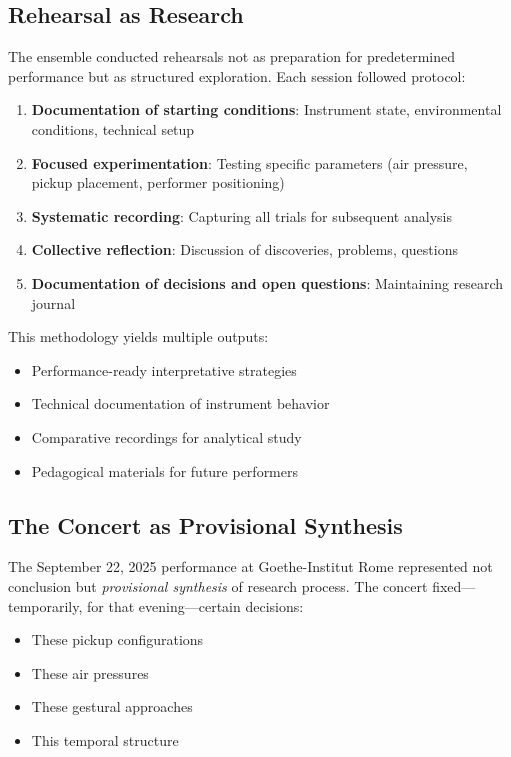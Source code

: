 \subsection{Rehearsal as Research}

The ensemble conducted rehearsals not as preparation for predetermined 
performance but as structured exploration. Each session followed protocol:

\begin{enumerate}
  \item \textbf{Documentation of starting conditions}: Instrument state, 
  environmental conditions, technical setup
  \item \textbf{Focused experimentation}: Testing specific parameters (air 
  pressure, pickup placement, performer positioning)
  \item \textbf{Systematic recording}: Capturing all trials for subsequent 
  analysis
  \item \textbf{Collective reflection}: Discussion of discoveries, problems, 
  questions
  \item \textbf{Documentation of decisions and open questions}: Maintaining 
  research journal
\end{enumerate}

This methodology yields multiple outputs:
\begin{itemize}
  \item Performance-ready interpretative strategies
  \item Technical documentation of instrument behavior
  \item Comparative recordings for analytical study
  \item Pedagogical materials for future performers
\end{itemize}

\subsection{The Concert as Provisional Synthesis}

The September 22, 2025 performance at Goethe-Institut Rome represented not 
conclusion but \emph{provisional synthesis} of research process. The concert 
fixed---temporarily, for that evening---certain decisions:
\begin{itemize}
  \item These pickup configurations
  \item These air pressures
  \item These gestural approaches
  \item This temporal structure
\end{itemize}

